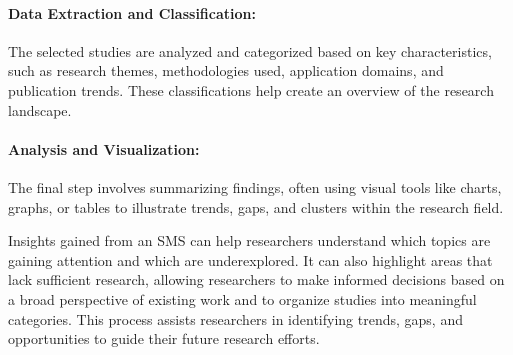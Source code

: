 \paragraph{\textbf{Data Extraction and Classification:}} 
The selected studies are analyzed and categorized based on key characteristics, such as research themes, methodologies used, application domains, and publication trends. These classifications help create an overview of the research landscape.

\paragraph{\textbf{Analysis and Visualization:}} 
The final step involves summarizing findings, often using visual tools like charts, graphs, or tables to illustrate trends, gaps, and clusters within the research field.


Insights gained from an SMS can help researchers understand which topics are 
gaining attention and which are underexplored. It can also highlight areas that lack sufficient research, allowing researchers to make informed decisions based on a broad perspective of 
existing work and to organize studies into meaningful categories. This process assists researchers in identifying trends, gaps, and opportunities to guide their future research efforts.



